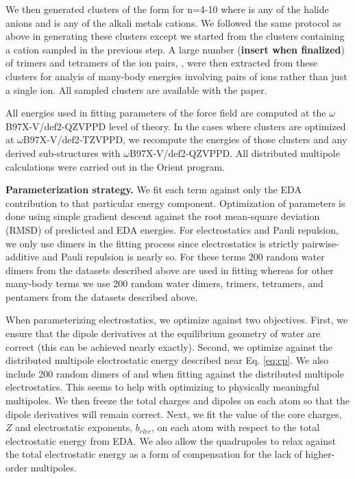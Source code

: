 \documentclass[journal=jctcce,manuscript=article]{achemso}
\begin{document}
We then generated clusters of the form  for n=4-10 where  is any of the halide anions and  is any of the alkali metals cations. We followed the same protocol as above in generating these clusters except we started from the clusters containing a cation sampled in the previous step. A large number (\textbf{insert when finalized}) of trimers and tetramers of the ion pairs, , were then extracted from these clusters for analyis of many-body energies involving pairs of ions rather than just a single ion. All sampled clusters are available with the paper. 

All energies used in fitting parameters of the force field are computed at the $\omega$B97X-V/def2-QZVPPD level of theory. In the cases where clusters are optimized at $\omega$B97X-V/def2-TZVPPD, we recompute the energies of those clusters and any derived sub-structures with $\omega$B97X-V/def2-QZVPPD. All distributed multipole calculations were carried out
in the Orient program.\cite{stone2002orient}

\textbf{Parameterization strategy.} We fit each term against only the EDA contribution to that particular energy component. Optimization of parameters is done using simple gradient descent against the root mean-square deviation (RMSD) of predicted and EDA energies. For electrostatics and Pauli repulsion, we only use dimers in the fitting process since electrostatics is strictly pairwise-additive and Pauli repulsion is nearly so. For these terms 200 random water dimers from the datasets described above are used in fitting whereas for other many-body terms we use 200 random water dimers, trimers, tetramers, and pentamers from the datasets described above.

When parameterizing electrostatics, we optimize against two objectives. First, we ensure that the dipole derivatives at the equilibrium geometry of water are correct (this can be achieved nearly exactly). Second, we optimize against the distributed multipole electrostatic energy described near Eq. \ref{eq:cp}. We also include 200 random dimers of  and  when fitting against the distributed multipole electrostatics. This seems to help with optimizing to physically meaningful multipoles. We then freeze the total charges and dipoles on each atom so that the dipole derivatives will remain correct. Next, we fit the value of the core charges, $Z$ and electrostatic exponents, $b_{elec}$, on each atom with respect to the total electrostatic energy from EDA. We also allow the quadrupoles to relax against the total electrostatic energy as a form of compensation for the lack of higher-order multipoles.
\end{document}
